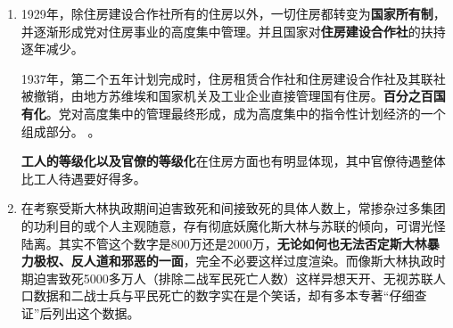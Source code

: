 \begin{enumerate}
\begin{quotation}
    （1933年1月10日，联席会议决议在对第一个五年计划总结中提到，）\textbf{苏联已从旧俄时代的落后的小农国家变为技术和经济最发达的先进国家之一}……\textbf{苏联已由农业国变为工业国}，从而巩固了\textbf{国家在经济上的独立}，因为苏联已经能够在本国的企业内生产大部分必须的设备。……\textbf{苏联已由小农国家变成了拥有规模最大的农业的国家}……\textbf{失业现象已经消失}……（因欧美经济大萧条影响）在美国，根据官方统计，但是加工工业中的在业人数，就由1928年的850万人减少到1932年的550万人。而根据美国劳工联合会的统计，美国整个工业中的失业人数，在1932年底已经达到\textbf{1200万}人……在英国，根据官方统计，失业人数由1928年的129万人增加到1932年的\textbf{280万}人。在德国，根据官方统计，失业人数由1928年的1376000人增加到1932年的\textbf{550万}人。

    到1934年，\textbf{社会主义成分的比重}，在国民收入中已占99.1\%，在工业总产值中已占99.8\%，在农业总产值中已占98.5\%，在商业企业零售商品流转额中已占100\%。
  \end{quotation}

\item 1929年，除住房建设合作社所有的住房以外，一切住房都转变为\textbf{国家所有制}，并逐渐形成党对住房事业的高度集中管理。并且国家对\textbf{住房建设合作社}的扶持逐年减少。

  1937年，第二个五年计划完成时，住房租赁合作社和住房建设合作社及其联社被撤销，由地方苏维埃和国家机关及工业企业直接管理国有住房。\textbf{百分之百国有化}。党对高度集中的管理最终形成，成为高度集中的指令性计划经济的一个组成部分。 。

  \textbf{工人的等级化以及官僚的等级化}在住房方面也有明显体现，其中官僚待遇整体比工人待遇要好得多。

\item 在考察受斯大林执政期间迫害致死和间接致死的具体人数上，常掺杂过多集团的功利目的或个人主观随意，存有彻底妖魔化斯大林与苏联的倾向，可谓光怪陆离。其实不管这个数字是800万还是2000万，\textbf{无论如何也无法否定斯大林暴力极权、反人道和邪恶的一面}，完全不必要这样过度渲染。而像斯大林执政时期迫害致死5000多万人（排除二战军民死亡人数）这样异想天开、无视苏联人口数据和二战士兵与平民死亡的数字实在是个笑话，却有多本专著“仔细查证”后列出这个数据。


\end{enumerate}
